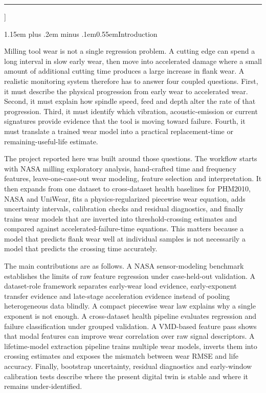\documentclass[10pt]{article}
\makeatletter
\renewcommand\section{\@startsection{section}{1}{0pt}%
  {1.15em plus .2em minus .1em}{0.55em}{\normalfont\normalsize\bfseries}}
\makeatother
\begin{document}
{\begin{@twocolumnfalse}
\vspace{1.8em}
\noindent\rule{\textwidth}{0.55pt}
\vspace{1.0em}
\end{@twocolumnfalse}
}]

\section{Introduction}

Milling tool wear is not a single regression problem. A cutting edge can spend a long interval in slow early wear, then move into accelerated damage where a small amount of additional cutting time produces a large increase in flank wear. A realistic monitoring system therefore has to answer four coupled questions. First, it must describe the physical progression from early wear to accelerated wear. Second, it must explain how spindle speed, feed and depth alter the rate of that progression. Third, it must identify which vibration, acoustic-emission or current signatures provide evidence that the tool is moving toward failure. Fourth, it must translate a trained wear model into a practical replacement-time or remaining-useful-life estimate.

The project reported here was built around those questions. The workflow starts with NASA milling exploratory analysis, hand-crafted time and frequency features, leave-one-case-out wear modeling, feature selection and interpretation. It then expands from one dataset to cross-dataset health baselines for PHM2010, NASA and UniWear, fits a physics-regularized piecewise wear equation, adds uncertainty intervals, calibration checks and residual diagnostics, and finally trains wear models that are inverted into threshold-crossing estimates and compared against accelerated-failure-time equations. This matters because a model that predicts flank wear well at individual samples is not necessarily a model that predicts the crossing time accurately.

The main contributions are as follows. A NASA sensor-modeling benchmark establishes the limits of raw feature regression under case-held-out validation. A dataset-role framework separates early-wear load evidence, early-exponent transfer evidence and late-stage acceleration evidence instead of pooling heterogeneous data blindly. A compact piecewise wear law explains why a single exponent is not enough. A cross-dataset health pipeline evaluates regression and failure classification under grouped validation. A VMD-based feature pass shows that modal features can improve wear correlation over raw signal descriptors. A lifetime-model extraction pipeline trains multiple wear models, inverts them into crossing estimates and exposes the mismatch between wear RMSE and life accuracy. Finally, bootstrap uncertainty, residual diagnostics and early-window calibration tests describe where the present digital twin is stable and where it remains under-identified.
\end{document}
